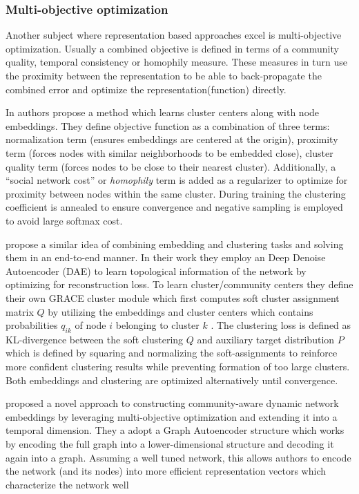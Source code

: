 \documentclass[
acmsmall,
nonacm,
screen,
acmthm]{../../scripts/pandoc/templates/acmart}
\begin{document}
\hypertarget{multi-objective-optimization}{%
\subsubsection{Multi-objective
optimization}\label{multi-objective-optimization}}

Another subject where representation based approaches excel is
multi-objective optimization. Usually a combined objective is defined in
terms of a community quality, temporal consistency or homophily measure.
These measures in turn use the proximity between the representation to
be able to back-propagate the combined error and optimize the
representation(function) directly.

In \citet{rozemberczkiGEMSECGraphEmbedding2019} authors propose a method
which learns cluster centers along with node embeddings. They define
objective function as a combination of three terms: normalization term
(ensures embeddings are centered at the origin), proximity term (forces
nodes with similar neighborhoods to be embedded close), cluster quality
term (forces nodes to be close to their nearest cluster). Additionally,
a ``social network cost'' or \emph{homophily} term is added as a
regularizer to optimize for proximity between nodes within the same
cluster. During training the clustering coefficient is annealed to
ensure convergence and negative sampling is employed to avoid large
softmax cost.

\citet{yangGraphClusteringDynamic2017} propose a similar idea of
combining embedding and clustering tasks and solving them in an
end-to-end manner. In their work they employ an Deep Denoise Autoencoder
(DAE) to learn topological information of the network by optimizing for
reconstruction loss. To learn cluster/community centers they define
their own GRACE cluster module which first computes soft cluster
assignment matrix \(Q\) by utilizing the embeddings and cluster centers
which contains probabilities \(q_{ik}\) of node \(i\) belonging to
cluster \(k\) . The clustering loss is defined as KL-divergence between
the soft clustering \(Q\) and auxiliary target distribution \(P\) which
is defined by squaring and normalizing the soft-assignments to reinforce
more confident clustering results while preventing formation of too
large clusters. Both embeddings and clustering are optimized
alternatively until convergence.

\citet{maCommunityawareDynamicNetwork2020} proposed a novel approach to
constructing community-aware dynamic network embeddings by leveraging
multi-objective optimization and extending it into a temporal dimension.
They a adopt a Graph Autoencoder structure which works by encoding the
full graph into a lower-dimensional structure and decoding it again into
a graph. Assuming a well tuned network, this allows authors to encode
the network (and its nodes) into more efficient representation vectors
which characterize the network well
\end{document}
